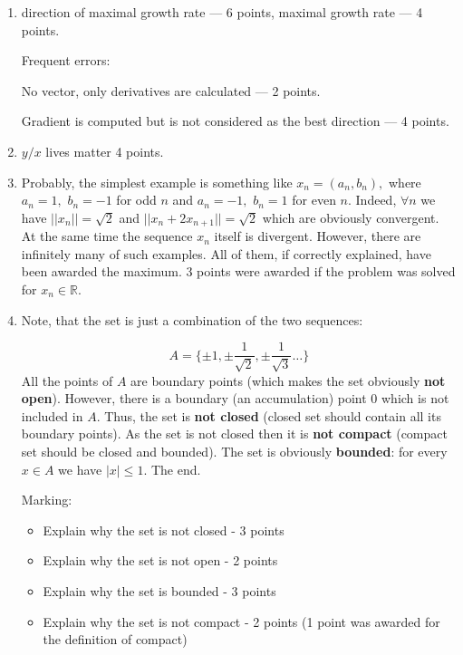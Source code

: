 \begin{enumerate}
        
    \item direction of maximal growth rate — 6 points, maximal growth rate — 4 points. 

    Frequent errors:
    
    No vector, only derivatives are calculated — 2 points.
    
    Gradient is computed but is not considered as the best direction — 4 points.

    \item $y/x$ lives matter 4 points. 
    
    \item Probably, the simplest example is something like $x_n = (a_n, b_n),$ where $a_{n} = 1,$ $b_{n} = -1$ for odd $n$ and $a_{n} = -1,$ $b_n = 1$ for even $n.$ Indeed, $\forall n$ we have $||x_n|| = \sqrt{2}$   and $||x_n + 2x_{n+1}|| = \sqrt{2}$ which are obviously convergent. At the same time the sequence $x_n$ itself is divergent. 
    However, there are infinitely many of such examples. All of them, if correctly explained, have been awarded the maximum. 3 points were awarded if the problem was solved for $x_n \in \mathbb{R}.$   
    \item  Note, that the set is just a combination of the two sequences: 

    $$A = \{\pm 1, \pm \frac{1}{\sqrt{2}}, \pm \frac{1}{\sqrt{3}}\dots\}
    $$
    All the points of $A$ are boundary points (which makes the set obviously \textbf{not open}). However, there is a boundary (an accumulation) point $0$ which is not included in $A.$ Thus, the set is \textbf{not closed} (closed set should contain all its boundary points). As the set is not closed then it is \textbf{not compact} (compact set should be closed and bounded). The set is obviously \textbf{bounded}: for every $x\in A$ we have $|x|\leq 1.$ The end.
    
    Marking:
    \begin{itemize}
        \item  Explain why the set is not closed - 3 points
        \item Explain why the set is not open - 2 points
        \item  Explain why the set is bounded - 3 points
        
        \item  Explain why the set is not compact - 2 points (1 point was awarded for the definition of compact)
        
        
    \end{itemize}
  

\end{enumerate}
